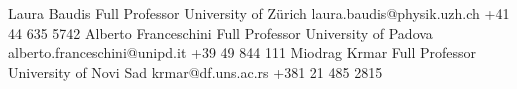 

\begin{referees}
		
	    {Laura Baudis}
	    {Full Professor}
	    {University of Z{\"u}rich}
	    {laura.baudis@physik.uzh.ch}
	    {+41 44 635 5742}
		{Alberto Franceschini}
		{Full Professor}
		{University of Padova}
		{alberto.franceschini@unipd.it}
		{+39 49 844 111}
		{Miodrag Krmar}
		{Full Professor}
		{University of Novi Sad}
		{krmar@df.uns.ac.rs}
		{+381 21 485 2815}
		
  \emptySeparator		
\end{referees}